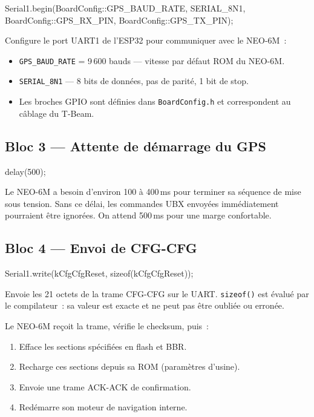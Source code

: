 \documentclass[12pt,a4paper]{article}
\newcommand{\code}[1]{\texttt{#1}}
\begin{document}
\begin{cppbox}
Serial1.begin(BoardConfig::GPS_BAUD_RATE, SERIAL_8N1,
              BoardConfig::GPS_RX_PIN, BoardConfig::GPS_TX_PIN);
\end{cppbox}

Configure le port UART1 de l'ESP32 pour communiquer avec le NEO-6M~:

\begin{itemize}
  \item \code{GPS\_BAUD\_RATE} = 9\,600 bauds --- vitesse par d\'efaut ROM du NEO-6M.
  \item \code{SERIAL\_8N1} --- 8 bits de donn\'ees, pas de parit\'e, 1 bit de stop.
  \item Les broches GPIO sont d\'efinies dans \code{BoardConfig.h} et
        correspondent au c\^ablage du T-Beam.
\end{itemize}

\subsection{Bloc 3 --- Attente de d\'emarrage du GPS}

\begin{cppbox}
delay(500);
\end{cppbox}

Le NEO-6M a besoin d'environ 100 \`a 400\,ms pour terminer sa s\'equence
de mise sous tension. Sans ce d\'elai, les commandes UBX envoy\'ees
imm\'ediatement pourraient \^etre ignor\'ees. On attend 500\,ms pour une
marge confortable.

\subsection{Bloc 4 --- Envoi de CFG-CFG}

\begin{cppbox}
Serial1.write(kCfgCfgReset, sizeof(kCfgCfgReset));
\end{cppbox}

Envoie les 21 octets de la trame CFG-CFG sur le UART. \code{sizeof()} est
\'evalu\'e par le compilateur~: sa valeur est exacte et ne peut pas \^etre
oubli\'ee ou erron\'ee.

Le NEO-6M re\c{c}oit la trame, v\'erifie le checksum, puis~:
\begin{enumerate}
  \item Efface les sections sp\'ecifi\'ees en flash et BBR.
  \item Recharge ces sections depuis sa ROM (param\`etres d'usine).
  \item Envoie une trame ACK-ACK de confirmation.
  \item Red\'emarre son moteur de navigation interne.
\end{enumerate}
\end{document}
